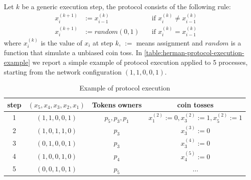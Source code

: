 Let $k$ be a generic execution step, the protocol consists of the
following rule:
\begin{displaymath}
  \begin{split}
    x_{i}^{(k+1)} &:= x_{i-1}^{(k)} \quad &\text{if } x_{i}^{(k)} \not=
    x_{i-1}^{(k)}\\
    x_{i}^{(k+1)} &:= random(0,1) \quad &\text{if } x_{i}^{(k)} =
    x_{i-1}^{(k)}
  \end{split}
\end{displaymath}
where $x_{i}^{(k)}$ is the value of $x_i$ at step $k$, $:=$ means
assignment and $random$ is a function that simulate a unbiased coin
toss. In \autoref{table:herman-protocol-execution-example} we report a
simple example of protocol execution applied to 5 processes, starting
from the network configuration $(1, 1, 0, 0, 1)$.
\begin{table}[ht]
  \begin{center}
    \begin{tabular}{cccc}
      \hline
      step & $(x_5, x_4, x_3, x_2, x_1)$ & Tokens owners & coin tosses \\ 
      \hline     
      1 & $(1, 1, 0, 0, 1)$ & $p_5, p_3, p_1$ & $x_1^{(2)}:= 0,
      x_3^{(2)}:= 1, x_5^{(2)}:= 1$  \\
      2 & $(1, 0, 1, 1, 0)$ & $p_3$ & $x_3^{(3)}:= 0$  \\
      3 & $(0, 1, 0, 0, 1)$ & $p_3$ & $x_3^{(4)}:= 0$  \\
      4 & $(1, 0, 0, 1, 0)$ & $p_4$ & $x_4^{(5)}:= 0$  \\
      5 & $(0, 0, 1, 0, 1)$ & $p_5$ & $\ldots$  \\ 
      \hline
    \end{tabular}
    \caption{Example of protocol execution}
    \label{table:herman-protocol-execution-example}
  \end{center}
\end{table}

